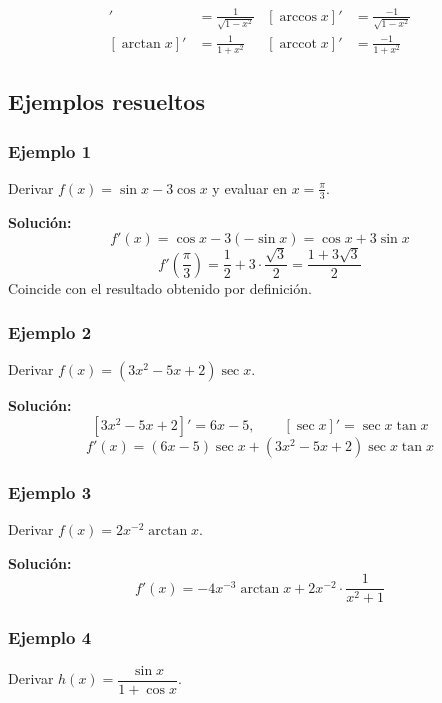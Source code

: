 \documentclass[12pt]{article}
\begin{document}
\begin{align*}
[\arcsin x]' &= \frac{1}{\sqrt{1 - x^2}} & [\arccos x]' &= \frac{-1}{\sqrt{1 - x^2}} \\
[\arctan x]' &= \frac{1}{1 + x^2} & [\operatorname{arccot} x]' &= \frac{-1}{1 + x^2}
\end{align*}



\subsection{Ejemplos resueltos}

\subsubsection{Ejemplo 1}


Derivar $f(x) = \sin x - 3\cos x$ y evaluar en $x = \frac{\pi}{3}$.

\textbf{Solución:}
\[
f'(x) = \cos x - 3(-\sin x) = \cos x + 3\sin x
\]
\[
f'\left(\frac{\pi}{3}\right) = \frac{1}{2} + 3 \cdot \frac{\sqrt{3}}{2} = \frac{1 + 3\sqrt{3}}{2}
\]
Coincide con el resultado obtenido por definición.



\subsubsection{Ejemplo 2}


Derivar $f(x) = (3x^2 - 5x + 2) \sec x$.

\textbf{Solución:}
\[
[3x^2 - 5x + 2]' = 6x - 5, \qquad [\sec x]' = \sec x \tan x
\]
\[
f'(x) = (6x - 5)\sec x + (3x^2 - 5x + 2)\sec x \tan x
\]



\subsubsection{Ejemplo 3}


Derivar $f(x) = 2x^{-2} \arctan x$.

\textbf{Solución:}
\[
f'(x) = -4x^{-3} \arctan x + 2x^{-2} \cdot \frac{1}{x^2 + 1}
\]



\subsubsection{Ejemplo 4}


Derivar $h(x) = \dfrac{\sin x}{1 + \cos x}$.
\end{document}
